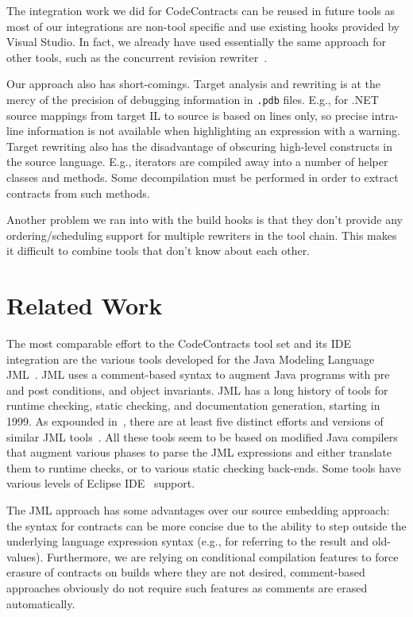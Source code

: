 \documentclass[10pt, conference, compsocconf]{IEEEtran}
\newcommand{\codefamily}{\sffamily}
\newcommand{\code}[1]{\lstinline[basicstyle=\codefamily\small]{#1}}
\begin{document}
The integration work we did for CodeContracts can be reused in future
tools as most of our integrations are non-tool specific and use
existing hooks provided by Visual Studio. In fact, we already have
used essentially the same approach for other tools, such as the
concurrent revision rewriter~\cite{Burckhardt:revisions}.

Our approach also has short-comings. Target analysis and rewriting is
at the mercy of the precision of debugging information in \code{.pdb} files. E.g., for
.NET source mappings from target IL to source is based on lines only,
so precise intra-line information is not available when highlighting
an expression with a warning. Target rewriting also has the
disadvantage of obscuring high-level constructs in the source language.
E.g., iterators are compiled away into a number of helper classes and
methods. Some decompilation must be performed in order to extract
contracts from such methods.

Another problem we ran into with the build hooks is that they don't
provide any ordering/scheduling support for multiple rewriters in the
tool chain. This makes it difficult to combine tools that don't
know about each other. 


\section{Related Work}
\label{sec:related}
\noindent
The most comparable effort to the CodeContracts tool set and its IDE
integration are the various tools developed for the Java Modeling
Language JML~\cite{JML}. JML uses a comment-based syntax to augment
Java programs with pre and post conditions, and object invariants.
JML has a long history of tools for runtime checking, static checking,
and documentation generation, starting in 1999. As expounded
in~\cite{openJML}, there are at least five distinct efforts and
versions of similar JML tools~\cite{JMLtools,eclipse-jmlc}. All these tools seem to be based on
modified Java compilers that augment various phases to parse the JML
expressions and either translate them to runtime checks, or to various
static checking back-ends. Some tools have various levels of Eclipse IDE~\cite{Eclipse,Eclipse-book}
support.

The JML approach has some advantages over our source embedding
approach: the syntax for contracts can be more concise due to the
ability to step outside the underlying language expression syntax
(e.g., for referring to the result and old-values). Furthermore, we are
relying on conditional compilation features to force erasure of
contracts on builds where they are not desired, comment-based
approaches obviously do not require such features as comments are
erased automatically.
\end{document}
